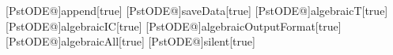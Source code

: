 [PstODE@]{append}[true]{}%
[PstODE@]{saveData}[true]{}%
[PstODE@]{algebraicT}[true]{}%
[PstODE@]{algebraicIC}[true]{}%
[PstODE@]{algebraicOutputFormat}[true]{}%
[PstODE@]{algebraicAll}[true]{}%
[PstODE@]{silent}[true]{}%
%
%
\def\pstODEsolve{\def\pst@par{}\pst@object{pstODEsolve}}%
